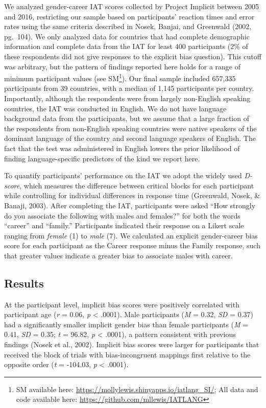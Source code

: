 \documentclass[man,floatsintext]{apa6}
\let\rmarkdownfootnote\footnote%
\def\footnote{\protect\rmarkdownfootnote}
\begin{document}
We analyzed gender-career IAT scores collected by Project Implicit between 2005 and 2016, restricting our sample based on participants' reaction times and error rates using the same criteria described in Nosek, Banjai, and Greenwald (2002, pg.~104). We only analyzed data for countries that had complete demographic information and complete data from the IAT for least 400 participants (2\% of these respondents did not give responses to the explicit bias question). This cutoff was arbitrary, but the pattern of findings reported here holds for a range of minimum participant values (see SM\footnote{SM available here: \url{https://mollylewis.shinyapps.io/iatlang_SI/}; All data and code available here: \url{https://github.com/mllewis/IATLANG}}). Our final sample included 657,335 participants from 39 countries, with a median of 1,145 participants per country. Importantly, although the respondents were from largely non-English speaking countries, the IAT was conducted in English. We do not have language background data from the participants, but we assume that a large fraction of the respondents from non-English speaking countries were native speakers of the dominant language of the country and second language speakers of English. The fact that the test was administered in English lowers the prior likelihood of finding language-specific predictors of the kind we report here.

To quantify participants' performance on the IAT we adopt the widely used \emph{D-score}, which measures the difference between critical blocks for each participant while controlling for individual differences in response time (Greenwald, Nosek, \& Banaji, 2003). After completing the IAT, participants were asked \enquote{How strongly do you associate the following with males and females?} for both the words \enquote{career} and \enquote{family.} Participants indicated their response on a Likert scale ranging from \emph{female} (1) to \emph{male} (7). We calculated an explicit gender-career bias score for each participant as the Career response minus the Family response, such that greater values indicate a greater bias to associate males with career.

\hypertarget{results}{%
\subsection{Results}\label{results}}

At the participant level, implicit bias scores were positively correlated with
participant age (\emph{r} = 0.06, \emph{p} \textless{} .0001). Male participants (\emph{M} = 0.32, \emph{SD} = 0.37) had a significantly smaller implicit gender bias than female participants (\emph{M} = 0.41, \emph{SD} = 0.35; \emph{t} = 96.82, \emph{p} \textless{} .0001), a pattern consistent with previous findings (Nosek et al., 2002). Implicit bias scores were larger for participants that received the block of trials with bias-incongruent mappings first relative to the opposite order (\emph{t} = -104.03, \emph{p} \textless{} .0001).
\end{document}
